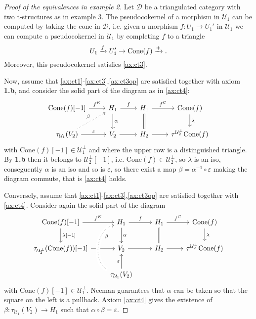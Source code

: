 \begin{proof}[Proof of the equivalences in example 2]
  Let $\mathcal{D}$ be a triangulated category with two t-structures as in example 3. The pseudocokernel
  of a morphism in $\mathcal{U}_1$ can be computed by taking the cone in $\mathcal{D}$, i.e. given a morphism
  $f:U_1\to U_1'$ in $\mathcal{U}_1$ we can compute a pseudocokernel in $\mathcal{U}_1$ by completing $f$
  to a triangle
  \begin{equation*}
    U_1\xrightarrow{f}U_1'\to \mathrm{Cone}(f)\xrightarrow{+}.
  \end{equation*}
  Moreover, this pseudocokernel satisfies \ref{ax:ct3}.

  Now, assume that \ref{ax:ct1}-\ref{ax:ct3},\ref{ax:ct3op} are satisfied together with axiom
  \textbf{1.b}, and consider the solid part of the diagram as in \ref{ax:ct4}:
  \begin{equation*}
    \begin{tikzcd}
      \mathrm{Cone}(f)[-1]\arrow{r}{f^K}
        & H_1\arrow{r}{f}\arrow{d}{\alpha}
          & H_1\arrow{r}{f^C}\arrow[equal]{d}
            & \mathrm{Cone}(f)\arrow{d}{\lambda}\\
      \tau_{\mathcal{U}_1}(V_2)\arrow{r}{\varepsilon}\arrow[dotted]{ur}{\beta}
        & V_2\arrow{r}
          & H_2\arrow{r}
            & \tau^{\mathcal{U}_2^\perp}\mathrm{Cone}(f)
    \end{tikzcd}
  \end{equation*}
  with $\mathrm{Cone}(f)[-1]\in\mathcal{U}_1^\perp$ and where the upper row is a
  distinguished triangle. By \textbf{1.b} then it belongs
  to $\mathcal{U}_2^\perp[-1]$, i.e. $\mathrm{Cone}(f)\in\mathcal{U}_2^\perp$, so
  $\lambda$ is an iso, conseguently $\alpha$ is an iso and so is $\varepsilon$, so
  there exist a map $\beta=\alpha^{-1}\circ\varepsilon$ making the diagram commute, that
  is \ref{ax:ct4} holds.

  Conversely, assume that \ref{ax:ct1}-\ref{ax:ct3},\ref{ax:ct3op} are satisfied together with
  \ref{ax:ct4}. Consider again the solid part of the diagram
  \begin{equation*}
    \begin{tikzcd}
      \mathrm{Cone}(f)[-1]\arrow{r}{f^K}\arrow{d}{\lambda[-1]}
        & H_1\arrow{r}{f}\arrow{d}{\alpha}
          & H_1\arrow{r}{f^C}\arrow[equal]{d}
            & \mathrm{Cone}(f)\arrow{d}{\lambda}\\
      \tau_{\mathcal{U}_2^\perp}(\mathrm{Cone}(f))[-1]\arrow{r}
        & V_2\arrow{r}
          & H_2\arrow{r}
            & \tau^{\mathcal{U}_2^\perp}\mathrm{Cone}(f)\\
        & \tau_{\mathcal{U}_1}(V_2)\arrow{u}{\varepsilon}\arrow[dotted, crossing over, bend left=70]{uu}[near end,']{\beta}
        & &
    \end{tikzcd}
  \end{equation*}
  with $\mathrm{Cone}(f)[-1]\in\mathcal{U}_1^\perp$. Neeman \cite[Lemma~1.4.3]{Nee01} guarantees
  that $\alpha$ can be taken so that the square on the left is a pullback. Axiom \ref{ax:ct4}
  gives the existence of $\beta:\tau_{\mathcal{U}_1}(V_2)\to H_1$ such that $\alpha\circ\beta=\varepsilon$.


\end{proof}
